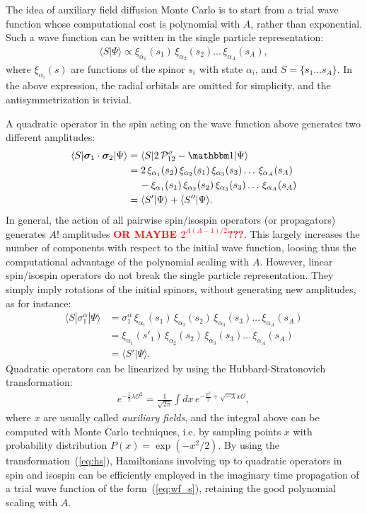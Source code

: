 \documentclass[aps,prc,twocolumn,superscriptaddress,floatfix]{revtex4-1}
\newcommand{\red}[1]{\protect\textcolor{red}{#1}}
\begin{document}
The idea of auxiliary field diffusion Monte Carlo is to start from a trial wave function
whose computational cost is polynomial with $A$, rather than exponential.
Such a wave function can be written in the single particle representation:
\begin{align}
\langle S|\Psi\rangle\propto\xi_{\alpha_1}(s_1)\,\xi_{\alpha_2}(s_2)\dots\,\xi_{\alpha_A}(s_A) ,
\label{eq:wf_s}
\end{align}
where $\xi_{\alpha_i}(s)$ are functions of the spinor $s_i$ with state $\alpha_i$,
and $S=\{s_1\dots s_A\}$. In the above expression, the radial orbitals are omitted for simplicity, 
and the antisymmetrization is trivial.

A quadratic operator in the spin acting on the wave function above generates two different amplitudes:
\begin{align}
\langle S|\bm\sigma_1\cdot\bm\sigma_2|\Psi\rangle & =\langle S|2\,\mathcal P_{12}^\sigma-\mathbbm1|\Psi\rangle \nonumber \\
& =2\,\xi_{\alpha_1}(s_2)\,\xi_{\alpha_2}(s_1)\,\xi_{\alpha_3}(s_3)\dots\,\xi_{\alpha_A}(s_A) \nonumber \\
& \quad\,-\xi_{\alpha_1}(s_1)\,\xi_{\alpha_2}(s_2)\,\xi_{\alpha_3}(s_3)\dots\,\xi_{\alpha_A}(s_A) \nonumber \\
& =\langle S'|\Psi\rangle+\langle S''|\Psi\rangle .
\nonumber
\end{align}
In general, the action of all pairwise spin/isospin operators (or propagators) generates $A!$ amplitudes \red{\bf OR MAYBE $2^{A(A-1)/2}$???}.
This largely increases the number of components with respect to the initial wave function, loosing thus the 
computational advantage of the polynomial scaling with $A$.
However, linear spin/isospin operators do not break the single particle representation. 
They simply imply rotations of the initial spinors, without generating new amplitudes, as for instance:
\begin{align}
\langle S|\sigma_1^\alpha|\Psi\rangle &=
\sigma_1^\alpha\,\xi_{\alpha_1}(s_1)\,\xi_{\alpha_2}(s_2)\,\xi_{\alpha_3}(s_3)\dots\,\xi_{\alpha_A}(s_A) \nonumber \\
& =\xi_{\alpha_1}(s'_1)\,\xi_{\alpha_2}(s_2)\,\xi_{\alpha_3}(s_3)\dots\,\xi_{\alpha_A}(s_A) \nonumber \\
& =\langle S'|\Psi\rangle .
\nonumber
\end{align}
Quadratic operators can be linearized by using the Hubbard-Stratonovich transformation:
\begin{align}
e^{-\frac{1}{2}\lambda \mathcal O^2}=\frac{1}{\sqrt{2\pi}}\int dx\, e^{-\frac{x^2}{2}+\sqrt{-\lambda}x\mathcal O} ,
\label{eq:hs}
\end{align}
where $x$ are usually called \emph{auxiliary fields}, and the integral above can
be computed with Monte Carlo techniques, i.e. by sampling points $x$ with  
probability distribution $P(x)=\exp(-x^2/2)$. By using the transformation~(\ref{eq:hs}),
Hamiltonians involving up to quadratic operators in spin and isospin can be efficiently
employed in the imaginary time propagation of a trial wave function of the form~(\ref{eq:wf_s}),
retaining the good polynomial scaling with $A$.
\end{document}
